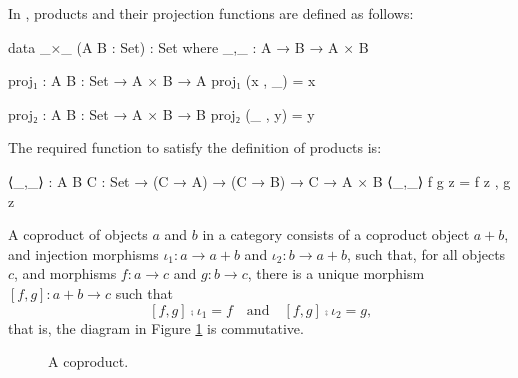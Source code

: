 \begin{example}
  \label{ex:product-agda}

  In \agda, products and their projection functions are defined as
  follows:
  \begin{codeagda}
data _×_ (A B : Set) : Set where
  _,_ : A → B → A × B

proj₁ : {A B : Set} → A × B → A
proj₁ (x , _) = x

proj₂ : {A B : Set} → A × B → B
proj₂ (_ , y) = y
  \end{codeagda}
  The required function to satisfy the definition of products is:
  \begin{codeagda}
⟨_,_⟩ : {A B C : Set} → (C → A) → (C → B) → C → A × B
⟨_,_⟩ f g z = f z , g z
  \end{codeagda}

\end{example}

\begin{definition}
  \label{def:coproduct}


  A coproduct of objects $a$ and $b$ in a category  consists of
  a coproduct object $a + b$, and injection morphisms $\iota_{1}: a
  \to a + b$ and $\iota_{2}: b \to a + b$, such that, for all objects
  $c$, and morphisms $f: a \to c$ and $g: b \to c$, there is a unique
  morphism $[f,g]: a + b \to c$ such that
  \begin{equation}
    \label{eq:coproduct}
    [f,g] \comp \iota_{1} = f
    \quad
    \text{and}
    \quad
    [f,g] \comp \iota_{2} = g
    \text{,}
  \end{equation}
  that is, the diagram in Figure \ref{fig:coproduct} is commutative.

  \begin{figure}[htb]
    \begin{center}
    \end{center}
    \caption{A coproduct.}
    \label{fig:coproduct}
  \end{figure}

\end{definition}


